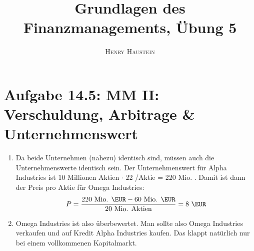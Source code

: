 \documentclass{article}
\title{\textbf{Grundlagen des Finanzmanagements, Übung 5}}
\author{\textsc{Henry Haustein}}
\date{}
\begin{document}
	\maketitle
	
	\section*{Aufgabe 14.5: MM II: Verschuldung, Arbitrage \& Unternehmenswert}
	\begin{enumerate}[label=(\alph*)]
		\item Da beide Unternehmen (nahezu) identisch sind, müssen auch die Unternehmenswerte identisch sein. Der Unternehmenswert für Alpha Industries ist 10 Millionen Aktien $\cdot$ 22 \EUR/Aktie = 220 Mio. \EUR. Damit ist dann der Preis pro Aktie für Omega Industries:
		\begin{align}
			P = \frac{220\text{ Mio. \EUR} - 60 \text{ Mio. \EUR}}{20\text{ Mio. Aktien}} = 8\text{ \EUR} \notag
		\end{align}
		\item Omega Industries ist also überbewertet. Man sollte also Omega Industries verkaufen und auf Kredit Alpha Industries kaufen. Das klappt natürlich nur bei einem vollkommenen Kapitalmarkt.
	\end{enumerate}
	
\end{document}
